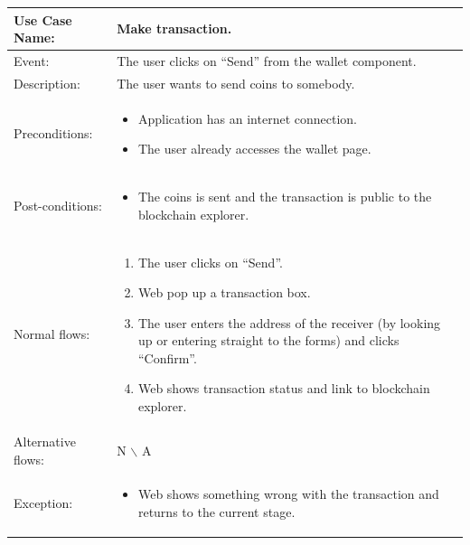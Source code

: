 \begin{table}[]
    \begin{tabular}{m{4cm} m{11cm} }
        \toprule
        Use Case Name:     & Make transaction.                                    \\ 
        \midrule 
        Event:             & The user clicks on “Send” from the wallet component. \\ 
        \midrule 
        Description:       & The user wants to send coins to somebody.  \\ 
        \midrule 
        Preconditions:     & \begin{itemize}
            \item Application has an internet connection.
            \item The user already accesses the wallet page.
        \end{itemize}                           \\ 
        \midrule 
        Post-conditions:   & \begin{itemize}
            \item The coins is sent and the transaction is public to the blockchain explorer.
        \end{itemize}                           \\ 
        \midrule 
        Normal flows:      & \begin{enumerate}
            \item The user clicks on “Send”.
            \item Web pop up a transaction box.
            \item The user enters the address of the receiver (by looking up or entering straight to the forms) and clicks “Confirm”.
            \item Web shows transaction status and link to blockchain explorer.
        \end{enumerate}                           \\ 
        \midrule 
        Alternative flows: & N $\backslash$ A                                     \\
        \midrule 
        Exception:         & \begin{itemize}
            \item {Web shows something wrong with the transaction and returns to the current stage.}
        \end{itemize}                           \\ 
        \bottomrule
    \end{tabular}
\end{table}
\clearpage

